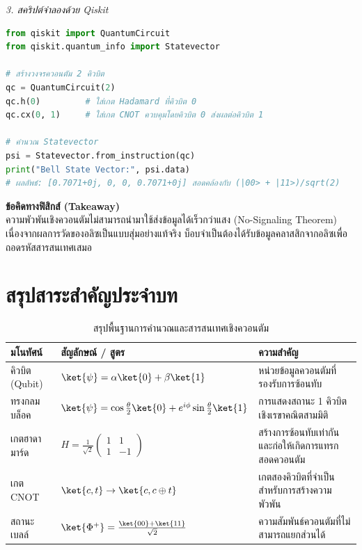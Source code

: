 \begin{psctexample}
\textit{3. สคริปต์จำลองด้วย Qiskit}
\begin{lstlisting}[language=Python, caption={การสร้างสถานะเบลล์ด้วย Qiskit}, label={lst:qiskit_bell}]
from qiskit import QuantumCircuit
from qiskit.quantum_info import Statevector

# สร้างวงจรควอนตัม 2 คิวบิต
qc = QuantumCircuit(2)
qc.h(0)         # ใส่เกต Hadamard ที่คิวบิต 0
qc.cx(0, 1)     # ใส่เกต CNOT ควบคุมโดยคิวบิต 0 ส่งผลต่อคิวบิต 1

# คำนวณ Statevector
psi = Statevector.from_instruction(qc)
print("Bell State Vector:", psi.data)
# ผลลัพธ์: [0.7071+0j, 0, 0, 0.7071+0j] สอดคล้องกับ (|00> + |11>)/sqrt(2)
\end{lstlisting}

\textbf{ข้อคิดทางฟิสิกส์ (Takeaway)} \\
ความพัวพันเชิงควอนตัมไม่สามารถนำมาใช้ส่งข้อมูลได้เร็วกว่าแสง (No-Signaling Theorem) เนื่องจากผลการวัดของอลิซเป็นแบบสุ่มอย่างแท้จริง บ็อบจำเป็นต้องได้รับข้อมูลคลาสสิกจากอลิซเพื่อถอดรหัสสารสนเทศเสมอ
\qedexam
\end{psctexample}

\section{สรุปสาระสำคัญประจำบท}

\begin{table}[H]
\centering
\small
\begin{tabularx}{\textwidth}{l >{\centering\arraybackslash}p{4.2cm} Y}
\toprule
\textbf{มโนทัศน์} & \textbf{สัญลักษณ์ / สูตร} & \textbf{ความสำคัญ} \\
\midrule
คิวบิต (Qubit) & $\ket{\psi} = \alpha\ket{0} + \beta\ket{1}$ & หน่วยข้อมูลควอนตัมที่รองรับการซ้อนทับ \\
ทรงกลมบล็อค & $\ket{\psi} = \cos\frac{\theta}{2}\ket{0} + e^{i\phi}\sin\frac{\theta}{2}\ket{1}$ & การแสดงสถานะ 1 คิวบิตเชิงเรขาคณิตสามมิติ \\
เกตฮาดามาร์ด & $H = \frac{1}{\sqrt{2}}\begin{pmatrix}1&1\\1&-1\end{pmatrix}$ & สร้างการซ้อนทับเท่ากันและก่อให้เกิดการแทรกสอดควอนตัม \\
เกต CNOT & $\ket{c, t} \to \ket{c, c \oplus t}$ & เกตสองคิวบิตที่จำเป็นสำหรับการสร้างความพัวพัน \\
สถานะเบลล์ & $\ket{\Phi^+} = \frac{\ket{00} + \ket{11}}{\sqrt{2}}$ & ความสัมพันธ์ควอนตัมที่ไม่สามารถแยกส่วนได้ \\
\bottomrule
\end{tabularx}
\caption{สรุปพื้นฐานการคำนวณและสารสนเทศเชิงควอนตัม}
\label{tab:quantum_computing_summary}
\end{table}

